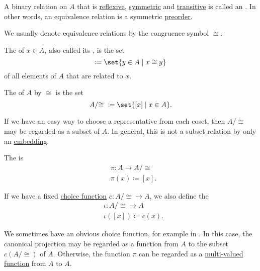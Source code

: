 \begin{definition}\label{def:equivalence_relation}
  A binary relation on \( A \) that is \hyperref[def:binary_relation/reflexive]{reflexive}, \hyperref[def:binary_relation/symmetric]{symmetric} and \hyperref[def:binary_relation/transitive]{transitive} is called an . In other words, an equivalence relation is a symmetric \hyperref[def:preordered_set]{preorder}.

  We usually denote equivalence relations by the congruence symbol \( \cong \).

  \begin{thmenum}
     The  of \( x \in A \), also called its , is the set
    \begin{equation*}
      [x] \coloneqq \set{ y \in A \given x \cong y }
    \end{equation*}
    of all elements of \( A \) that are related to \( x \).

     The  of \( A \) by \( \cong \) is the set
    \begin{equation*}
      A / {\cong} \ \coloneqq \set{ [x] \given x \in A }.
    \end{equation*}

     If we have an easy way to choose a representative from each coset, then \( A / {\cong} \) may be regarded as a subset of \( A \). In general, this is not a subset relation by only an \hyperref[def:first_order_homomorphism_invertibility/embedding]{embedding}.

     The  is
    \begin{equation*}
      \begin{aligned}
        &\pi: A \to A / {\cong}  \\
        &\pi(x) \coloneqq [x].
      \end{aligned}
    \end{equation*}

    If we have a fixed \hyperref[def:choice_function]{choice function} \( c: A / {\cong} \to A \), we also define the 
    \begin{equation*}
      \begin{aligned}
        &\iota: A / {\cong} \to A \\
        &\iota([x]) \coloneqq c(x).
      \end{aligned}
    \end{equation*}

    We sometimes have an obvious choice function, for example in . In this case, the canonical projection may be regarded as a function from \( A \) to the subset \( c(A / {\cong}) \) of \( A \). Otherwise, the function \( \pi \) can be regarded as a \hyperref[def:multi_valued_function]{multi-valued function} from \( A \) to \( A \).
  \end{thmenum}
\end{definition}

